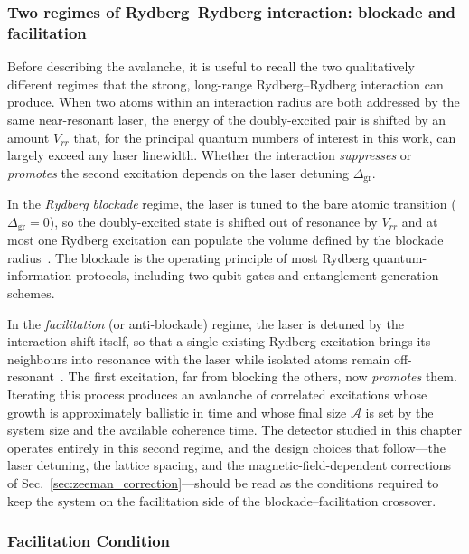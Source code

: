 \subsubsection*{Two regimes of Rydberg--Rydberg interaction: blockade and facilitation}

Before describing the avalanche, it is useful to recall the two qualitatively different regimes that the strong, long-range Rydberg--Rydberg interaction can produce. When two atoms within an interaction radius are both addressed by the same near-resonant laser, the energy of the doubly-excited pair is shifted by an amount $V_{rr}$ that, for the principal quantum numbers of interest in this work, can largely exceed any laser linewidth. Whether the interaction \emph{suppresses} or \emph{promotes} the second excitation depends on the laser detuning $\Delta_{\mathrm{gr}}$.

In the \emph{Rydberg blockade} regime, the laser is tuned to the bare atomic transition ($\Delta_{\mathrm{gr}} = 0$), so the doubly-excited state is shifted out of resonance by $V_{rr}$ and at most one Rydberg excitation can populate the volume defined by the blockade radius~\cite{saffman2010quantum,Urban2009,Gaetan2009}. The blockade is the operating principle of most Rydberg quantum-information protocols, including two-qubit gates and entanglement-generation schemes.

In the \emph{facilitation} (or anti-blockade) regime, the laser is detuned by the interaction shift itself, so that a single existing Rydberg excitation brings its neighbours into resonance with the laser while isolated atoms remain off-resonant~\cite{Valado2016,Festa2022}. The first excitation, far from blocking the others, now \emph{promotes} them. Iterating this process produces an avalanche of correlated excitations whose growth is approximately ballistic in time and whose final size $\mathcal{A}$ is set by the system size and the available coherence time. The detector studied in this chapter operates entirely in this second regime, and the design choices that follow---the laser detuning, the lattice spacing, and the magnetic-field-dependent corrections of Sec.~\ref{sec:zeeman_correction}---should be read as the conditions required to keep the system on the facilitation side of the blockade--facilitation crossover.

\subsubsection*{Facilitation Condition}

